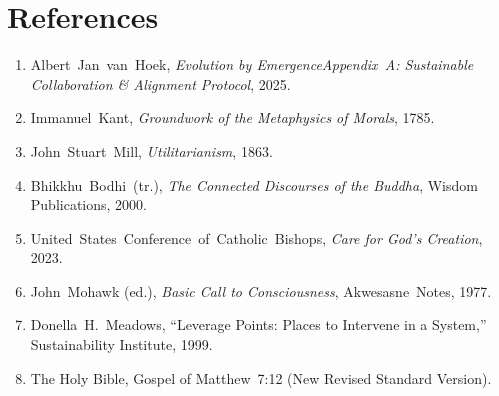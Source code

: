 \section*{References}
\begin{enumerate}
  \item Albert Jan van Hoek, \emph{Evolution by Emergence\textemdash Appendix A: Sustainable Collaboration \& Alignment Protocol}, 2025.
  \item Immanuel Kant, \emph{Groundwork of the Metaphysics of Morals}, 1785.
  \item John Stuart Mill, \emph{Utilitarianism}, 1863.
  \item Bhikkhu Bodhi (tr.), \emph{The Connected Discourses of the Buddha}, Wisdom Publications, 2000.
  \item United States Conference of Catholic Bishops, \emph{Care for God’s Creation}, 2023.
  \item John Mohawk (ed.), \emph{Basic Call to Consciousness}, Akwesasne Notes, 1977.
  \item Donella H. Meadows, “Leverage Points: Places to Intervene in a System,” Sustainability Institute, 1999.
  \item The Holy Bible, Gospel of Matthew 7:12 (New Revised Standard Version).
\end{enumerate}

